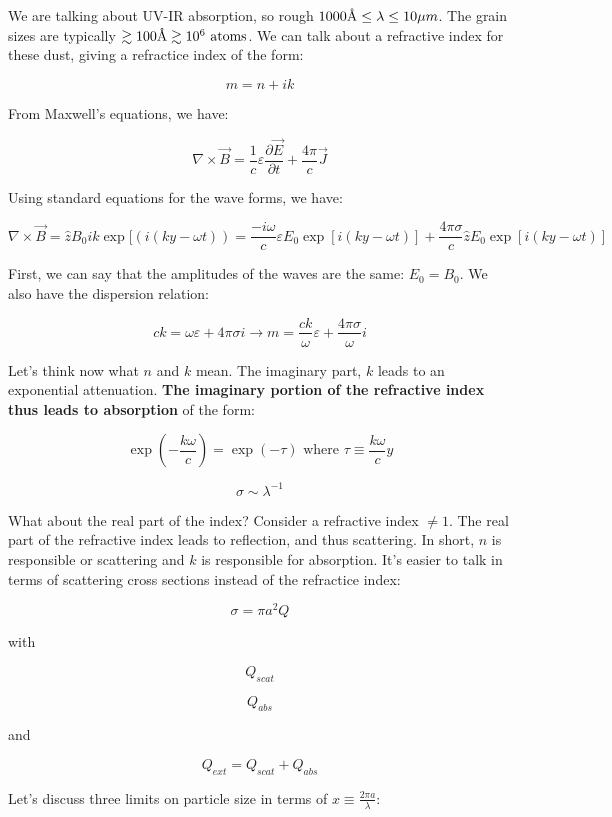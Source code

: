 \documentclass{article}
\newcommand{\angstrom}{\mbox{\normalfont\AA}}
\def\Bfield{{\vec{B}}}
\def\Efield{{\vec {E}}}
\def\bfield{{\vec B}}
\begin{document}
We are talking about UV-IR absorption, so rough $1000 \angstrom \leq \lambda \leq 10 \mu m$. The grain sizes are typically $\gtrsim 100 \angstrom \gtrsim 10^6 \text{ atoms}$. We can talk about a refractive index for these dust, giving a refractice index of the form:

$$
m = n + ik
$$

From Maxwell's equations, we have:

$$
\nabla \times \bfield = \frac{1}{c} \varepsilon \frac{\partial \Efield}{\partial t} + \frac{4\pi}{c}\vec{J}
$$

Using standard equations for the wave forms, we have:

$$
\nabla \times \Bfield = \hat{z} B_0 ik \exp[\left(i\left(ky-\omega t\right)\right) = \frac{-i\omega}{c}\varepsilon E_0 \exp\left[i\left(ky - \omega t\right)\right] + \frac{4\pi \sigma}{c}\hat{z}  E_0 \exp\left[i\left(ky - \omega t\right)\right]
$$

First, we can say that the amplitudes of the waves are the same: $E_0 = B_0$. We also have the dispersion relation:

$$
ck = \omega \varepsilon + 4\pi \sigma i \rightarrow m = \frac{ck}{\omega} \varepsilon + \frac{4\pi \sigma}{\omega}i
$$

Let's think now what $n$ and $k$ mean. The imaginary part, $k$ leads to an exponential attenuation. \textbf{The imaginary portion of the refractive index thus leads to absorption} of the form:

$$
\exp\left(-\frac{k\omega}{c}\right) = \exp\left(-\tau\right) \text{ where } \tau \equiv \frac{k\omega}{c}y
$$

$$
\sigma \sim \lambda^{-1}
$$

What about the real part of the index? Consider a refractive index $\neq 1$. The real part of the refractive index leads to reflection, and thus scattering. In short, $n$ is responsible or scattering and $k$ is responsible for absorption. It's easier to talk in terms of scattering cross sections instead of the refractice index:

$$
\sigma = \pi a^2 Q
$$

with 

$$
Q_{scat}
$$

$$
Q_{abs}
$$

and 

$$
Q_{ext} = Q_{scat} + Q_{abs}
$$

Let's discuss three limits on particle size in terms of $x \equiv \frac{2\pi a}{\lambda}$:
\end{document}

